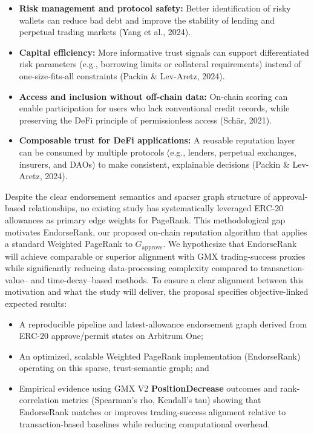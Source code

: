 \begin{itemize}
\item[\textbullet] \textbf{Risk management and protocol safety: }Better identification of risky wallets can reduce bad debt and improve the stability of lending and perpetual trading markets (Yang et al., 2024).
\item[\textbullet] \textbf{Capital efficiency: }More informative trust signals can support differentiated risk parameters (e.g., borrowing limits or collateral requirements) instead of one-size-fits-all constraints (Packin \& Lev-Aretz, 2024).
\item[\textbullet] \textbf{Access and inclusion without off-chain data: }On-chain scoring can enable participation for users who lack conventional credit records, while preserving the DeFi principle of permissionless access (Sch\"{a}r, 2021).
\item[\textbullet] \textbf{Composable trust for DeFi applications: }A reusable reputation layer can be consumed by multiple protocols (e.g., lenders, perpetual exchanges, insurers, and DAOs) to make consistent, explainable decisions (Packin \& Lev-Aretz, 2024).
\end{itemize}
Despite the clear endorsement semantics and sparser graph structure of approval-based relationships, no existing study has systematically leveraged ERC-20 allowances as primary edge weights for PageRank. This methodological gap motivates EndorseRank, our proposed on-chain reputation algorithm that applies a standard Weighted PageRank to $G_{\text{approve}}$. We hypothesize that EndorseRank will achieve comparable or superior alignment with GMX trading-success proxies while significantly reducing data-processing complexity compared to transaction-value-- and time-decay--based methods. To ensure a clear alignment between this motivation and what the study will deliver, the proposal specifies objective-linked expected results:


\begin{itemize}
\item[\textbullet] A reproducible pipeline and latest-allowance endorsement graph derived from ERC-20 approve/permit states on Arbitrum One;
\item[\textbullet] An optimized, scalable Weighted PageRank implementation (EndorseRank) operating on this sparse, trust-semantic graph; and
\item[\textbullet] Empirical evidence using GMX V2 \textbf{PositionDecrease} outcomes and rank-correlation metrics (Spearman's rho, Kendall's tau) showing that EndorseRank matches or improves trading-success alignment relative to transaction-based baselines while reducing computational overhead.
\end{itemize}
